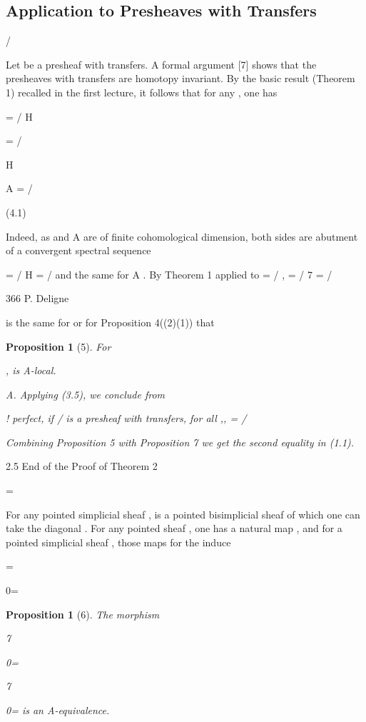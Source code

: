 \documentclass[11pt,a4paper]{article}
\theoremstyle{plain}
\newtheorem{proposition}[theorem]{Proposition}
\theoremstyle{definition}
\begin{document}
\subsection{Application to Presheaves with Transfers}


/

Let be a presheaf with transfers. A formal argument [7] shows that the presheaves
with transfers 
are homotopy invariant. By the basic result (Theorem 1)
recalled in the first lecture, it follows that for any , one has

 = / 
H





 = / 

H

  A = / 



(4.1)

Indeed, as
and
 A are of finite cohomological dimension, both sides are
abutment of a convergent spectral sequence

      = /   H  = / 
and the same for   A . By Theorem 1 applied to  = / ,
    = /     7 = / 

366
P. Deligne




is the same for
or for
Proposition 4((2)(1)) that
\begin{proposition}[5]
For

, is A-local.



  A. Applying (3.5), we conclude from

! perfect, if / is a presheaf with transfers, for all ,, = / 

Combining Proposition 5 with Proposition 7 we get the second equality in (1.1).

\end{proposition}

2.5 End of the Proof of Theorem 2

= 

For any pointed simplicial sheaf  ,   is a pointed bisimplicial sheaf of which
one can take the diagonal
  . For any pointed sheaf , one has a natural map
, and for a pointed simplicial sheaf  , those maps for the  induce


= 

0=  

\begin{proposition}[6]
The morphism

7



0=  

7



0=  is an A-equivalence.

\end{proposition}
\end{document}
